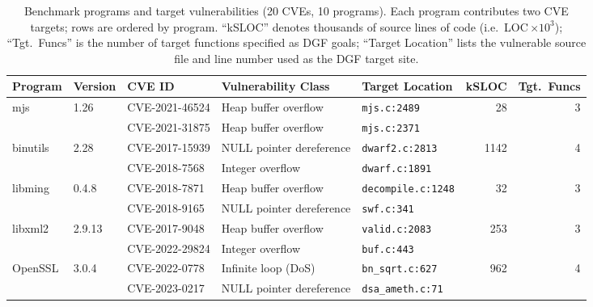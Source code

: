 \documentclass[preprint,12pt,3p]{elsarticle}
\begin{document}
\begin{table}[t]
\centering
\small
\caption{Benchmark programs and target vulnerabilities (20 CVEs, 10 programs).
  Each program contributes two CVE targets; rows are ordered by program.
  ``kSLOC'' denotes thousands of source lines of code (i.e.\
  LOC\,$\times 10^{3}$); ``Tgt.\ Funcs'' is the number of target functions
  specified as DGF goals; ``Target Location'' lists the vulnerable
  source file and line number used as the DGF target site.}
\label{tbl:benchmarks}
\begin{tabular}{llp{2.5cm}p{3.2cm}p{4.2cm}rr}
\toprule
\textbf{Program} & \textbf{Version} & \textbf{CVE ID}
  & \textbf{Vulnerability Class} & \textbf{Target Location}
  & \textbf{kSLOC} & \textbf{Tgt.\ Funcs} \\
\midrule
\multirow{2}{*}{mjs}     & \multirow{2}{*}{1.26}
  & CVE-2021-46524 & Heap buffer overflow
  & \texttt{mjs.c:2489}
  & \multirow{2}{*}{28}   & \multirow{2}{*}{3} \\
  &  & CVE-2021-31875 & Heap buffer overflow
  & \texttt{mjs.c:2371}
  &                       &                    \\[2pt]
\multirow{2}{*}{binutils}& \multirow{2}{*}{2.28}
  & CVE-2017-15939 & NULL pointer dereference
  & \texttt{dwarf2.c:2813}
  & \multirow{2}{*}{1142} & \multirow{2}{*}{4} \\
  &  & CVE-2018-7568  & Integer overflow
  & \texttt{dwarf.c:1891}
  &                       &                    \\[2pt]
\multirow{2}{*}{libming} & \multirow{2}{*}{0.4.8}
  & CVE-2018-7871  & Heap buffer overflow
  & \texttt{decompile.c:1248}
  & \multirow{2}{*}{32}   & \multirow{2}{*}{3} \\
  &  & CVE-2018-9165  & NULL pointer dereference
  & \texttt{swf.c:341}
  &                       &                    \\[2pt]
\multirow{2}{*}{libxml2} & \multirow{2}{*}{2.9.13}
  & CVE-2017-9048  & Heap buffer overflow
  & \texttt{valid.c:2083}
  & \multirow{2}{*}{253}  & \multirow{2}{*}{3} \\
  &  & CVE-2022-29824 & Integer overflow
  & \texttt{buf.c:443}
  &                       &                    \\[2pt]
\multirow{2}{*}{OpenSSL} & \multirow{2}{*}{3.0.4}
  & CVE-2022-0778  & Infinite loop (DoS)
  & \texttt{bn\_sqrt.c:627}
  & \multirow{2}{*}{962}  & \multirow{2}{*}{4} \\
  &  & CVE-2023-0217  & NULL pointer dereference
  & \texttt{dsa\_ameth.c:71}
  &                       &                    \\[2pt]

\end{tabular}
\end{table}
\end{document}
